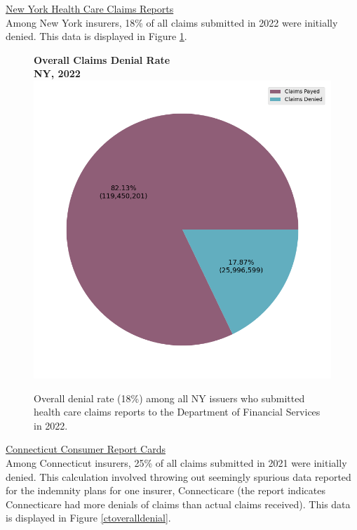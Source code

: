 \documentclass[12pt, a4paper,twoside,parskip=full]{report}
\theoremstyle{plain} %
\theoremstyle{definition} %
\theoremstyle{remark} %
\numberwithin{equation}{chapter}
\begin{document}
		\underline{New York Health Care Claims Reports}\\
		
			Among New York insurers, 18\% of all claims submitted in 2022 were initially denied. This data is displayed in Figure \ref{newyorkoveralldenial}.
			
			\begin{figure}[h!]
				\centering
				\textbf{Overall Claims Denial Rate}\\
				\textbf{NY, 2022}\\
				\includegraphics[width=.6\columnwidth]{images/ny_claim_reports/overall_denial_pie.png}
				\caption{Overall denial rate (18\%) among all NY issuers who submitted health care claims reports to the Department of Financial Services in 2022.}
				\label{newyorkoveralldenial}
			\end{figure}
		
		\clearpage
		
		
		\underline{Connecticut Consumer Report Cards}\\
		
		Among Connecticut insurers, 25\% of all claims submitted in 2021 were initially denied. This calculation involved throwing out seemingly spurious data reported for the indemnity plans for one insurer, Connecticare (the report indicates Connecticare had more denials of claims than actual claims received). This data is displayed in Figure \ref{ctoveralldenial}.
		
\end{document}
